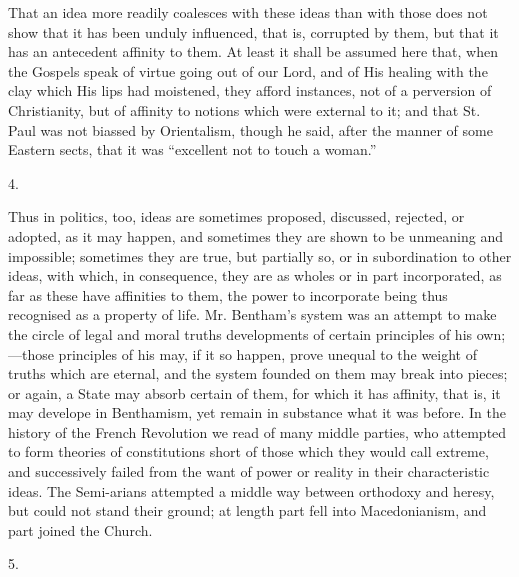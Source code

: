 That an idea more readily coalesces with these ideas
than with those does not show that it has been unduly
influenced, that is, corrupted by them, but that it has
an antecedent affinity to them. At least it shall be
assumed here that, when the Gospels speak of virtue going
out of our Lord, and of His healing with the clay which
His lips had moistened, they afford instances, not of a
perversion of Christianity, but of affinity to notions
which were external to it; and that St. Paul was not
biassed by Orientalism, though he said, after the manner
of some Eastern sects, that it was ``excellent not to
touch a woman.''

4.

Thus in politics, too, ideas are sometimes proposed,
discussed, rejected, or adopted, as it may happen, and
sometimes they are shown to be unmeaning and impossible;
sometimes they are true, but partially so, or in
subordination to other ideas, with which, in consequence,
they are as wholes or in part incorporated, as far as
these have affinities to them, the power to incorporate
being thus recognised as a property of life. Mr.
Bentham's system was an attempt to make the circle of
legal and moral truths developments of certain
principles of his own;—those principles of his may,
if it so happen, prove unequal to the weight of truths
which are eternal, and the system founded on them may
break into pieces; or again, a State may absorb certain
of them, for which it has affinity, that is, it may
develope in Benthamism, yet remain in substance what it
was before. In the history of the French Revolution we
read of many middle parties, who attempted to form
theories of constitutions short of those which they would
call extreme, and successively failed from the want of
power or reality in their characteristic ideas. The
Semi-arians attempted a middle way between orthodoxy and
heresy, but could not stand their ground; at length part
fell into Macedonianism, and part joined the Church.

5.

